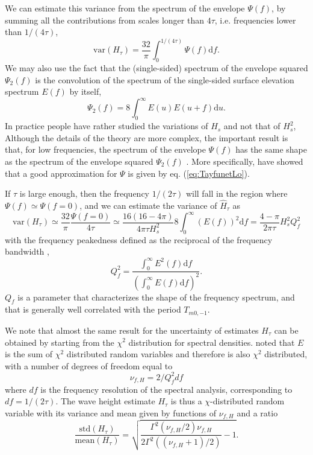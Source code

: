 {We can estimate this variance from the spectrum of the envelope $\Psi (f)$, by summing all the contributions from scales longer than $4 \tau$, i.e. frequencies lower than $1/(4 \tau)$, 
\begin{equation}
   \mathrm{var}(H_\tau) = \frac{32}{\pi} \int_0^{1/(4 \tau)} \Psi (f) {\mathrm d} f.
   \label{eq:relation_Hs_eta}
\end{equation}
We may also use the fact that the (single-sided) spectrum of the envelope squared  $\Psi_2(f)$ is the convolution of the spectrum of the single-sided
surface elevation spectrum $E(f)$ by itself,
\begin{equation}
    \Psi_{2}(f) = 8 \int_0^\infty E(u)E(u+f)\mathrm{d}u. 
\label{eq:psi2_1sided}
\end{equation}
 In practice people have rather studied the variations of $H_s$ and not that of $H_s^2$, 
 Although the details of the theory are more complex, the important result is that, for low frequencies, the spectrum of the envelope $\Psi(f)$ has the same shape as the spectrum of the envelope squared $\Psi_2(f)$ \citep{Rice1944}. More specifically, \cite{Tayfun&Lo1989} have showed that a good approximation for $\Psi$ is given by eq. (\ref{eq:TayfunetLo}). 

If $\tau$ is large enough, then the frequency $1/(2 \tau)$ will fall in the region where $\Psi(f) \simeq \Psi(f=0)$, and we can estimate the  variance of $\widehat{H}_\tau$ as
\begin{equation}
   \mathrm{var}(H_\tau)\simeq \frac{32}{\pi} \frac{\Psi (f=0)}{4 \tau} \simeq \frac{16(16 - 4 \pi) }{4 \pi \tau H_s^2} 8 \int_0^\infty (E(f))^2 {\mathrm d}f =  \frac{4 -  \pi }{ 2 \pi  \tau }  H_s^2 Q_f^2 
   \label{eq:groups_var_1D}
\end{equation}
with the frequency peakedness defined as the reciprocal of the frequency bandwidth \citep{Saulnier&al.2012}, 
\begin{equation} 
   Q_f^2 = \frac{  \int_{0}^\infty E^2(f)\mathrm{d}f}{\left(\int_{0}^\infty E(f)\mathrm{d}f\right)^2}. \label{eq:Qf}
\end{equation}
$Q_f$ is a parameter that characterizes the shape of the frequency spectrum, and that is generally well correlated with the period $T_{m0,-1}$. 

We note that almost the same result for the uncertainty of estimates $H_\tau$ can be obtained by starting from the $\chi^2$ distribution for 
spectral densities. \cite{Young1986} noted that $E$ is the sum of $\chi^2$ distributed random variables and therefore is also $\chi^2$ distributed, with a number of degrees of freedom equal to 
\begin{equation}
\nu_{f,H}=2/ Q_f^2 df
\end{equation}
 where $df$ is the frequency resolution of the spectral analysis, corresponding to $df=1/(2 \tau)$. The wave height estimate $H_\tau$ is thus a $\chi$-distributed random variable with its variance and mean given by  functions of $\nu_{f,H}$ and a ratio 
 \begin{equation}
\frac{\mathrm{std}(H_\tau)}{\mathrm{mean}(H_\tau)} =\sqrt{\frac{\Gamma^2(\nu_{f,H}/2) \nu_{f,H}}{2 \Gamma^2((\nu_{f,H}+1)/2)}-1}.
   \label{eq:groups_var_nu}
\end{equation}
 
}
